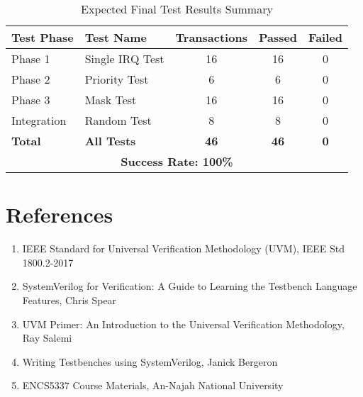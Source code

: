 \documentclass[12pt,a4paper]{article}
\begin{document}
\begin{table}[H]
    \centering
    \begin{tabular}{|l|l|c|c|c|}
        \hline
        \textbf{Test Phase} & \textbf{Test Name} & \textbf{Transactions} & \textbf{Passed} & \textbf{Failed} \\
        \hline
        Phase 1 & Single IRQ Test & 16 & 16 & 0 \\
        \hline
        Phase 2 & Priority Test & 6 & 6 & 0 \\
        \hline
        Phase 3 & Mask Test & 16 & 16 & 0 \\
        \hline
        Integration & Random Test & 8 & 8 & 0 \\
        \hline
        \textbf{Total} & \textbf{All Tests} & \textbf{46} & \textbf{46} & \textbf{0} \\
        \hline
        \multicolumn{5}{|c|}{\textbf{Success Rate: 100\%}} \\
        \hline
    \end{tabular}
    \caption{Expected Final Test Results Summary}
    \label{tab:final_results}
\end{table}

\section{References}
\begin{enumerate}
    \item IEEE Standard for Universal Verification Methodology (UVM), IEEE Std 1800.2-2017
    \item SystemVerilog for Verification: A Guide to Learning the Testbench Language Features, Chris Spear
    \item UVM Primer: An Introduction to the Universal Verification Methodology, Ray Salemi
    \item Writing Testbenches using SystemVerilog, Janick Bergeron
    \item ENCS5337 Course Materials, An-Najah National University
\end{enumerate}
\end{document}
